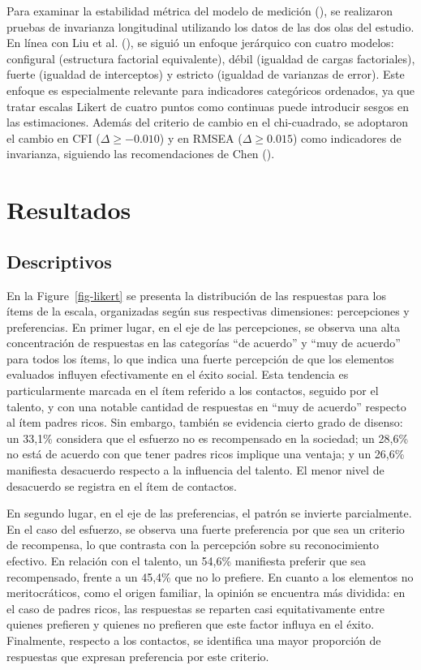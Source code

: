\documentclass[
  12pt,
]{article}
\begin{document}
Para examinar la estabilidad métrica del modelo de medición
(), se
realizaron pruebas de invarianza longitudinal utilizando los datos de
las dos olas del estudio. En línea con Liu et al.
(), se siguió un enfoque jerárquico
con cuatro modelos: configural (estructura factorial equivalente), débil
(igualdad de cargas factoriales), fuerte (igualdad de interceptos) y
estricto (igualdad de varianzas de error). Este enfoque es especialmente
relevante para indicadores categóricos ordenados, ya que tratar escalas
Likert de cuatro puntos como continuas puede introducir sesgos en las
estimaciones. Además del criterio de cambio en el chi-cuadrado, se
adoptaron el cambio en CFI (\(\Delta \geq -0.010\)) y en RMSEA
(\(\Delta \geq 0.015\)) como indicadores de invarianza, siguiendo las
recomendaciones de Chen ().

\section{Resultados}\label{resultados}

\subsection{Descriptivos}\label{descriptivos}

En la Figure~\ref{fig-likert} se presenta la distribución de las
respuestas para los ítems de la escala, organizadas según sus
respectivas dimensiones: percepciones y preferencias. En primer lugar,
en el eje de las percepciones, se observa una alta concentración de
respuestas en las categorías ``de acuerdo'' y ``muy de acuerdo'' para
todos los ítems, lo que indica una fuerte percepción de que los
elementos evaluados influyen efectivamente en el éxito social. Esta
tendencia es particularmente marcada en el ítem referido a los
contactos, seguido por el talento, y con una notable cantidad de
respuestas en ``muy de acuerdo'' respecto al ítem padres ricos. Sin
embargo, también se evidencia cierto grado de disenso: un 33,1\%
considera que el esfuerzo no es recompensado en la sociedad; un 28,6\%
no está de acuerdo con que tener padres ricos implique una ventaja; y un
26,6\% manifiesta desacuerdo respecto a la influencia del talento. El
menor nivel de desacuerdo se registra en el ítem de contactos.

En segundo lugar, en el eje de las preferencias, el patrón se invierte
parcialmente. En el caso del esfuerzo, se observa una fuerte preferencia
por que sea un criterio de recompensa, lo que contrasta con la
percepción sobre su reconocimiento efectivo. En relación con el talento,
un 54,6\% manifiesta preferir que sea recompensado, frente a un 45,4\%
que no lo prefiere. En cuanto a los elementos no meritocráticos, como el
origen familiar, la opinión se encuentra más dividida: en el caso de
padres ricos, las respuestas se reparten casi equitativamente entre
quienes prefieren y quienes no prefieren que este factor influya en el
éxito. Finalmente, respecto a los contactos, se identifica una mayor
proporción de respuestas que expresan preferencia por este criterio.
\end{document}
